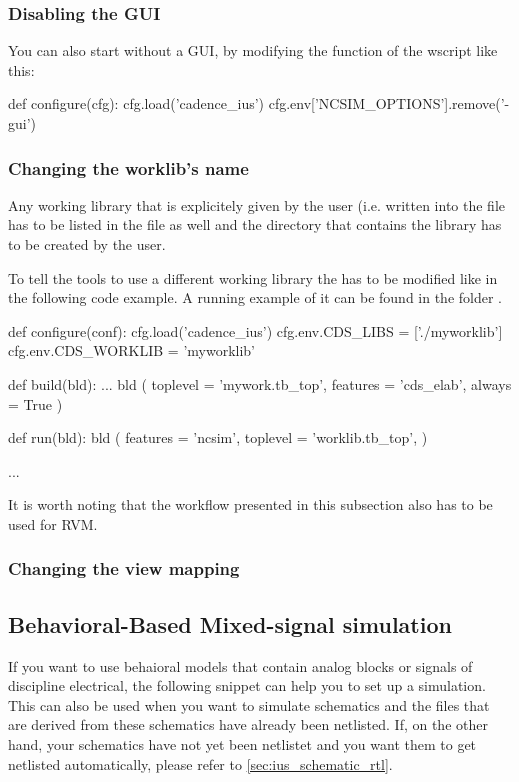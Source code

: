 \subsubsection{Disabling the  GUI}
You can also start  without a GUI, by modifying the 
function of the wscript like this:
\begin{lstwscript}
def configure(cfg):
    cfg.load('cadence_ius')
    cfg.env['NCSIM_OPTIONS'].remove('-gui')
\end{lstwscript}

\subsubsection{Changing the worklib's name}
Any working library that is explicitely given by the user (i.e. written into
the  file has to be listed in the  file as well and the
directory that contains the library has to be created by the user.

To tell the  tools to use a different working library the
 has to be modified like in the following code example. A running
example of it can be found in the folder
.

\begin{lstwscript}
def configure(conf):
    cfg.load('cadence_ius')
    cfg.env.CDS_LIBS = ['./myworklib']
    cfg.env.CDS_WORKLIB = 'myworklib'

def build(bld):
    ...
    bld (
        toplevel = 'mywork.tb_top',
        features = 'cds_elab',
        always = True
    )

def run(bld):
    bld (
        features = 'ncsim',
        toplevel = 'worklib.tb_top',
    )

...
\end{lstwscript}

It is worth noting that the workflow presented in this subsection also has to
be used for \gls{RVM}.

\subsubsection{Changing the view mapping}


\clearpage
\subsection{Behavioral-Based Mixed-signal simulation}
\label{sec:ius_behave_rtl}
If you want to use  behaioral models that contain analog blocks
or signals of discipline electrical, the following  snippet can
help you to set up a simulation. This  can also be used when you
want to simulate schematics and the  files that are derived
from these schematics have already been netlisted. If, on the other hand, your
schematics have not yet been netlistet and you want them to get netlisted
automatically, please refer to \cref{sec:ius_schematic_rtl}.


